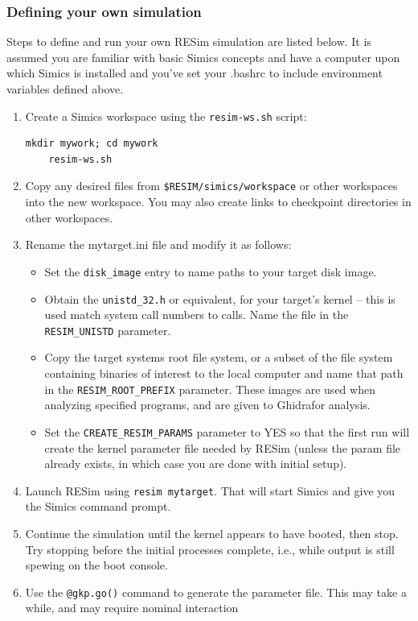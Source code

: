 \documentclass[titlepage]{article}
\begin{document}
\subsubsection{Defining your own simulation}
Steps to define and run your own RESim simulation are listed below.  It is assumed you are familiar with basic Simics concepts and have a
computer upon which Simics is installed and you've set your .bashrc to include environment variables defined above.
\begin{enumerate}
\item Create a Simics workspace using the {\tt resim-ws.sh} script:
\begin{verbatim}
mkdir mywork; cd mywork
    resim-ws.sh 
\end{verbatim}

\item Copy any desired files from {\tt \$RESIM/simics/workspace} or other workspaces into the new workspace.  You may also create links
to checkpoint directories in other workspaces.
\item Rename the mytarget.ini file and modify it as follows:
\begin{itemize}
\item Set the {\tt disk\_image} entry to name paths to your target disk image.
\item Obtain the {\tt unistd\_32.h} or equivalent, for your target's kernel -- this is used match system call numbers to calls.  Name
the file in the {\tt RESIM\_UNISTD} parameter.
\item Copy the target systems root file system, or a subset of the file system containing binaries of interest to the local computer
and name that path in the {\tt RESIM\_ROOT\_PREFIX} parameter.  These images are used when analyzing specified programs, and are given
to Ghidrafor analysis.
\item Set the {\tt CREATE\_RESIM\_PARAMS} parameter to YES so that the first run will create the kernel parameter file needed by RESim
(unless the param file already exists, in which case you are done with initial setup).  
\end{itemize}
\item Launch RESim using {\tt resim mytarget}.  That will start Simics and give you the Simics command prompt.
\item  Continue the simulation until the kernel appears to have booted, then stop.  Try stopping before the initial processes complete, i.e.,
while output is still spewing on the boot console.
\item Use the {\tt @gkp.go()} command to generate the parameter file.  This may take a while, and may require nominal interaction

\end{enumerate}
\end{document}
